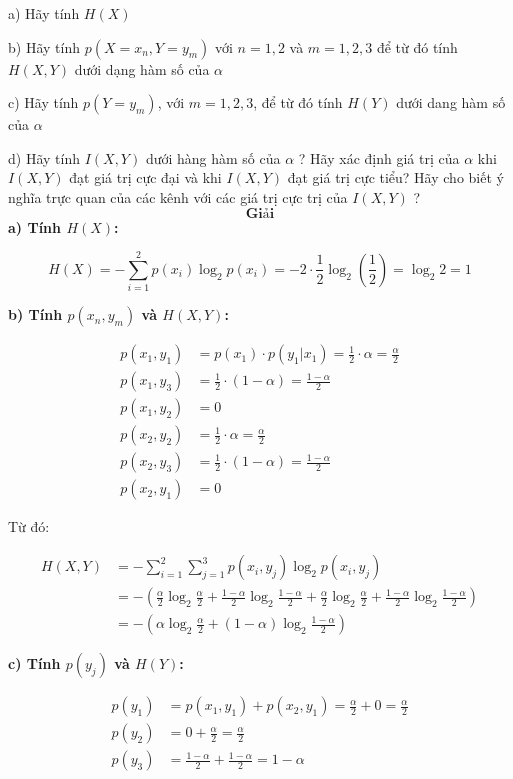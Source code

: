 \documentclass[12pt]{article}
\begin{document}
a) Hãy tính $H(X)$

b) Hãy tính $p(X=x_n,Y=y_m)$ với $n=1,2$ và $m=1,2,3$ để từ đó tính $H(X,Y)$ dưới dạng hàm số của $\alpha$

c) Hãy tính $p(Y=y_m)$, với $m=1,2,3$, để từ đó tính $H(Y)$ dưới dang hàm số của $\alpha$ 

d) Hãy tính $I(X,Y)$ dưới hàng hàm số của $\alpha$ ? Hãy xác định giá trị của $\alpha$ khi $I(X,Y)$ đạt giá trị cực đại và khi $I(X,Y)$ đạt giá trị cực tiểu? Hãy cho biết ý nghĩa trực quan của các kênh với các giá trị cực trị của $I(X,Y)$ ?
\[
\textbf{Giải}
\]
\textbf{a) Tính $H(X)$:}

\[
H(X) = - \sum_{i=1}^{2} p(x_i) \log_2 p(x_i) = -2 \cdot \frac{1}{2} \log_2 \left( \frac{1}{2} \right) = \log_2 2 = 1
\]

\textbf{b) Tính $p(x_n, y_m)$ và $H(X,Y)$:}

\[
\begin{aligned}
p(x_1, y_1) &= p(x_1) \cdot p(y_1|x_1) = \frac{1}{2} \cdot \alpha = \frac{\alpha}{2} \\
p(x_1, y_3) &= \frac{1}{2} \cdot (1 - \alpha) = \frac{1 - \alpha}{2} \\
p(x_1, y_2) &= 0 \\
p(x_2, y_2) &= \frac{1}{2} \cdot \alpha = \frac{\alpha}{2} \\
p(x_2, y_3) &= \frac{1}{2} \cdot (1 - \alpha) = \frac{1 - \alpha}{2} \\
p(x_2, y_1) &= 0
\end{aligned}
\]

Từ đó:

\[
\begin{aligned}
H(X,Y) &= -\sum_{i=1}^{2} \sum_{j=1}^{3} p(x_i, y_j) \log_2 p(x_i, y_j) \\
&= -\left( \frac{\alpha}{2} \log_2 \frac{\alpha}{2} + \frac{1 - \alpha}{2} \log_2 \frac{1 - \alpha}{2} + \frac{\alpha}{2} \log_2 \frac{\alpha}{2} + \frac{1 - \alpha}{2} \log_2 \frac{1 - \alpha}{2} \right) \\
&= -\left( \alpha \log_2 \frac{\alpha}{2} + (1 - \alpha) \log_2 \frac{1 - \alpha}{2} \right)
\end{aligned}
\]

\textbf{c) Tính $p(y_j)$ và $H(Y)$:}

\[
\begin{aligned}
p(y_1) &= p(x_1, y_1) + p(x_2, y_1) = \frac{\alpha}{2} + 0 = \frac{\alpha}{2} \\
p(y_2) &= 0 + \frac{\alpha}{2} = \frac{\alpha}{2} \\
p(y_3) &= \frac{1 - \alpha}{2} + \frac{1 - \alpha}{2} = 1 - \alpha
\end{aligned}
\]
\end{document}
